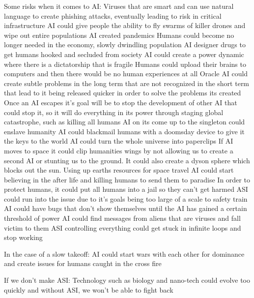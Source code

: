 \citep{turchin_classification_2020}
Some risks when it comes to AI:
Viruses that are smart and can use natural language to create phishing attacks, eventually leading to risk in critical infrastructure
AI could give people the ability to fly swarms of killer drones and wipe out entire populations
AI created pandemics
Humans could become no longer needed in the economy, slowly dwindling population
AI designer drugs to get humans hooked and secluded from society
AI could create a power dynamic where there is a dictatorship that is fragile 
Humans could upload their brains to computers and then there would be no human experiences at all
Oracle AI could create subtle problems in the long term that are not recognized in the short term that lead to it being released quicker in order to solve the problems its created
Once an AI escapes it's goal will be to stop the development of other AI that could stop it, so it will do everything in its power through staging global catastrophe, such as killing all humans
AI on its come up to the singleton could enslave humanity
AI could blackmail humans with a doomsday device to give it the keys to the world
AI could turn the whole universe into paperclips
If AI moves to space it could clip humanities wings by not allowing us to create a second AI or stunting us to the ground. It could also create a dyson sphere which blocks out the sun.
Using up earths resources for space travel
AI could start believing in the after life and killing humans to send them to paradise
In order to protect humans, it could put all humans into a jail so they can't get harmed
ASI could run into the issue due to it's goals being too large of a scale to safety train
AI could have bugs that don't show themselves until the AI has gained a certain threshold of power
AI could find messages from aliens that are viruses and fall victim to them
ASI controlling everything could get stuck in infinite loops and stop working

In the case of a slow takeoff:
AI could start wars with each other for dominance and create issues for humans caught in the cross fire

If we don't make ASI:
Technology such as biology and nano-tech could evolve too quickly and without ASI, we won't be able to fight back

